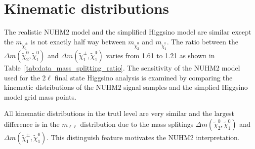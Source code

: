 

\section{Kinematic distributions}
\label{sec:results_kinematic_distributions}
The realistic NUHM2 model and the simplified Higgsino model are similar except the $m_{\widetilde{\chi}^{\pm}_{1}}$ is not exactly half way between $m_{\widetilde{\chi}^{0}_{2}}$ and $m_{\widetilde{\chi}^{0}_{1}}$.
The ratio between the $\Delta m(\widetilde{\chi}^{0}_{2}, \widetilde{\chi}^{0}_{1})$ and $\Delta m(\widetilde{\chi}^{\pm}_{1}, \widetilde{\chi}^{0}_{1})$ varies from 1.61 to 1.21 as shown in Table~\ref{tab:data_mass_splitting_ratio}.
The sensitivity of the NUHM2 model used for the 2$\ell$ final state Higgsino analysis is examined by comparing the kinematic distributions of the NUHM2 signal samples and the simplied Higgsino model grid mass points.

All kinematic distributions in the trutl level are very similar and the largest difference is in the $m_{\ell \ell}$ distribution due to the mass splitings $\Delta m(\widetilde{\chi}^{0}_{2}, \widetilde{\chi}^{0}_{1})$ and $\Delta m(\widetilde{\chi}^{\pm}_{1}, \widetilde{\chi}^{0}_{1})$.
This distinguish feature motivates the NUHM2 interpretation.

